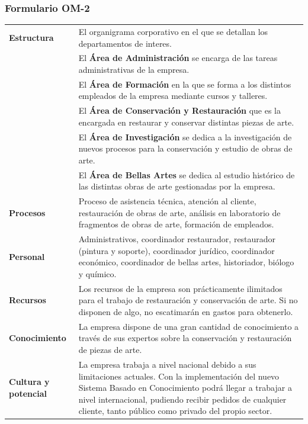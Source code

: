 \documentclass[a4paper,11pt]{article}
\begin{document}
			\subsubsection{Formulario OM-2}
			\begin{center}
				\begin{tabular}{| p{2.5cm} | p{9cm} |}
					\hline
					\textbf{Estructura} & El organigrama corporativo en el que se detallan los
					departamentos de interes.\\
					& El \textbf{Área de Administración} se encarga de las tareas
					administrativas de la empresa.\\
					& El \textbf{Área de Formación} en la que se forma a los distintos
					empleados de la empresa mediante cursos y talleres.\\
					& El \textbf{Área de Conservación y Restauración} que es la encargada en
					restaurar y conservar distintas piezas de arte.\\
					& El \textbf{Área de Investigación} se dedica a la investigación de nuevos
					procesos para la conservación y estudio de obras de arte.\\
					& El \textbf{Área de Bellas Artes} se dedica al estudio histórico de las
					distintas obras de arte gestionadas por la empresa.\\
					\hline
					\textbf{Procesos} & Proceso de asistencia técnica, atención al cliente,
					restauración de obras de arte, análisis en laboratorio de fragmentos de obras de arte, formación de empleados.\\
					\hline
					\textbf{Personal} & Administrativos, coordinador restaurador, restaurador
					(pintura y soporte), coordinador jurídico, coordinador económico, coordinador de bellas artes, historiador, biólogo y químico.\\
					\hline
					\textbf{Recursos} & Los recursos de la empresa son prácticamente ilimitados
					para el trabajo de restauración y conservación de arte. Si no disponen de algo, no escatimarán en gastos para obtenerlo.\\
					\hline
					\textbf{Conocimiento} & La empresa dispone de una gran cantidad de
					conocimiento a través de sus expertos sobre la conservación y restauración de piezas de arte.\\
					\hline
					\textbf{Cultura y potencial} & La empresa trabaja a nivel nacional debido a
					sus limitaciones actuales. Con la implementación del nuevo Sistema Basado en Conocimiento podrá llegar a trabajar a nivel internacional, pudiendo recibir pedidos de cualquier cliente, tanto público como privado del propio sector.\\

\end{tabular}
\end{center}
\end{document}
